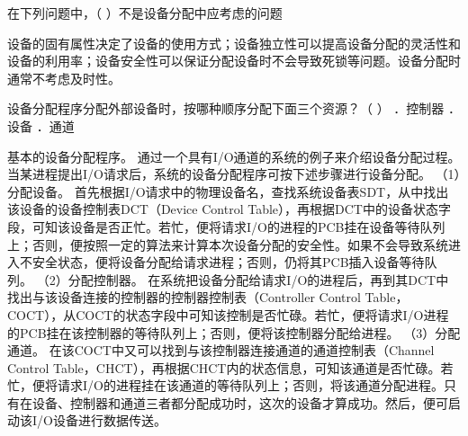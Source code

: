 \question 在下列问题中，（ ）不是设备分配中应考虑的问题
\par{}
\begin{solution}设备的固有属性决定了设备的使用方式；设备独立性可以提高设备分配的灵活性和设备的利用率；设备安全性可以保证分配设备时不会导致死锁等问题。设备分配时通常不考虑及时性。
\end{solution}
\question 设备分配程序分配外部设备时，按哪种顺序分配下面三个资源？（ ） ．控制器
．设备 ．通道
\par{}
\begin{solution}基本的设备分配程序。
通过一个具有I/O通道的系统的例子来介绍设备分配过程。当某进程提出I/O请求后，系统的设备分配程序可按下述步骤进行设备分配。
（1）分配设备。
首先根据I/O请求中的物理设备名，查找系统设备表SDT，从中找出该设备的设备控制表DCT（Device
Control
Table），再根据DCT中的设备状态字段，可知该设备是否正忙。若忙，便将请求I/O的进程的PCB挂在设备等待队列上；否则，便按照一定的算法来计算本次设备分配的安全性。如果不会导致系统进入不安全状态，便将设备分配给请求进程；否则，仍将其PCB插入设备等待队列。
（2）分配控制器。
在系统把设备分配给请求I/O的进程后，再到其DCT中找出与该设备连接的控制器的控制器控制表（Controller
Control
Table，COCT），从COCT的状态字段中可知该控制是否忙碌。若忙，便将请求I/O进程的PCB挂在该控制器的等待队列上；否则，便将该控制器分配给进程。
（3）分配通道。
在该COCT中又可以找到与该控制器连接通道的通道控制表（Channel Control
Table，CHCT），再根据CHCT内的状态信息，可知该通道是否忙碌。若忙，便将请求I/O的进程挂在该通道的等待队列上；否则，将该通道分配进程。只有在设备、控制器和通道三者都分配成功时，这次的设备才算成功。然后，便可启动该I/O设备进行数据传送。
\end{solution}
